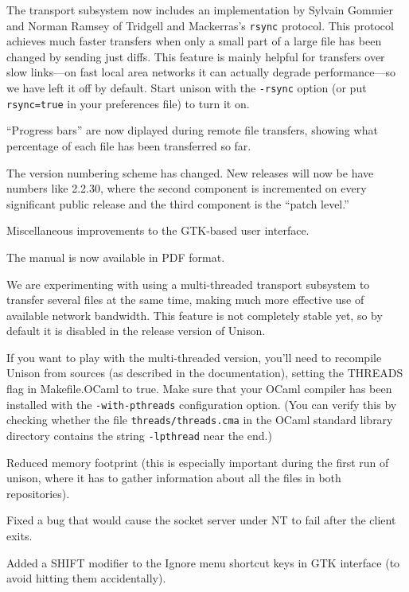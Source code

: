 \begin{changesfromversion}{2.1}
\item The transport subsystem now includes an implementation by
Sylvain Gommier and Norman Ramsey of Tridgell and Mackerras's
\verb|rsync| protocol.  This protocol achieves much faster
transfers when only a small part of a large file has been changed by
sending just diffs.  This feature is mainly helpful for transfers over
slow links---on fast local area networks it can actually degrade
performance---so we have left it off by default.  Start unison with
the \verb|-rsync| option (or put \verb|rsync=true| in your preferences
file) to turn it on.

\item ``Progress bars'' are now diplayed during remote file transfers,
showing what percentage of each file has been transferred so far.

\item The version numbering scheme has changed.  New releases will now
      be have numbers like 2.2.30, where the second component is
      incremented on every significant public release and the third
      component is the ``patch level.''

\item Miscellaneous improvements to the GTK-based user interface.
\item The manual  is now available in PDF format.

\item We are experimenting with using a multi-threaded transport
subsystem to transfer several files at the same time, making
much more effective use of available network bandwidth.  This feature
is not completely stable yet, so by default it is disabled in the
release version of Unison.

If you want to play with the multi-threaded version, you'll need to
recompile Unison from sources (as described in the documentation),
setting the THREADS flag in Makefile.OCaml to true.  Make sure that
your OCaml compiler has been installed with the \verb|-with-pthreads|
configuration option.  (You can verify this by checking whether the
file \verb|threads/threads.cma| in the OCaml standard library
directory contains the string \verb|-lpthread| near the end.)
\end{changesfromversion}

\begin{changesfromversion}{1.292}
\item Reduced memory footprint (this is especially important during
the first run of unison, where it has to gather information about all
the files in both repositories).
\item Fixed a bug that would cause the socket server under NT to fail
  after the client exits.
\item Added a SHIFT modifier to the Ignore menu shortcut keys in GTK
  interface (to avoid hitting them accidentally).
\end{changesfromversion}

